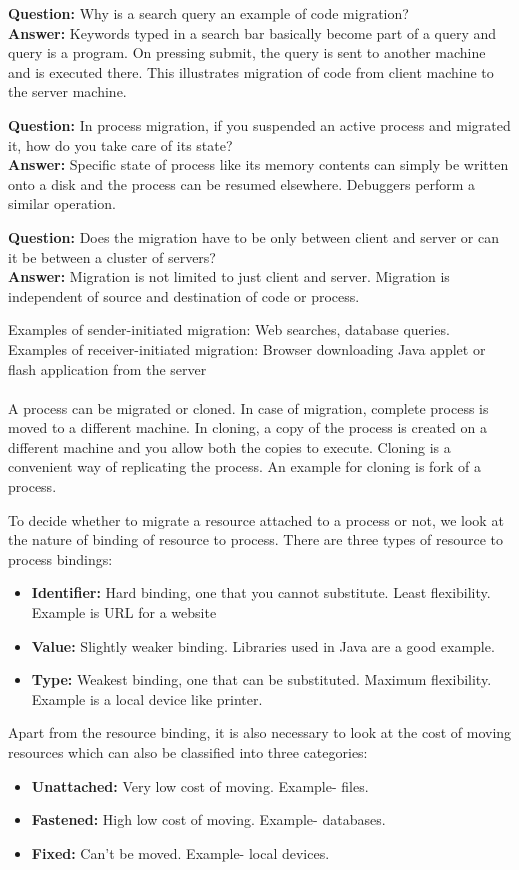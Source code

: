 \documentclass[twoside]{article}
\begin{document}
\textbf{Question:} Why is a search query an example of code migration?
\\ \textbf{Answer:} Keywords typed in a search bar basically become part of a query and query is a program. On pressing submit, the query is sent to another machine and is executed there. This illustrates migration of code from client machine to the server machine.

\textbf{Question:} In process migration, if you suspended an active process and migrated it, how do you take care of its state?
\\ \textbf{Answer:} Specific state of process like its memory contents can simply be written onto a disk and the process can be resumed elsewhere. Debuggers perform a similar operation.

\textbf{Question:} Does the migration have to be only between client and server or can it be between a cluster of servers?
\\ \textbf{Answer:} Migration is not limited to just client and server. Migration is independent of source and destination of code or process.

Examples of sender-initiated migration: Web searches, database queries.
Examples of receiver-initiated migration: Browser downloading Java applet or flash application from the server
\\
\\A process can be migrated or cloned. In case of migration, complete process is moved to a different machine. In cloning, a copy of the process is created on a different machine and you allow both the copies to execute. Cloning is a convenient way of replicating the process. An example for cloning is fork of a process. 

To decide whether to migrate a resource attached to a process or not, we look at the nature of binding of resource to process. There are three types of resource to process bindings:
\begin{itemize}
    \item \textbf{Identifier:} Hard binding, one that you cannot substitute. Least flexibility. Example is URL for a website 
    \item \textbf{Value:} Slightly weaker binding. Libraries used in Java are a good example.
    \item \textbf{Type:} Weakest binding, one that can be substituted. Maximum flexibility. Example is a local device like printer.
\end{itemize}

Apart from the resource binding, it is also necessary to look at the cost of moving resources which can also be classified into three categories:
\begin{itemize}
    \item \textbf{Unattached:} Very low cost of moving. Example- files.
    \item \textbf{Fastened:} High low cost of moving. Example- databases.
    \item \textbf{Fixed:} Can't be moved. Example- local devices.
\end{itemize}
\end{document}
